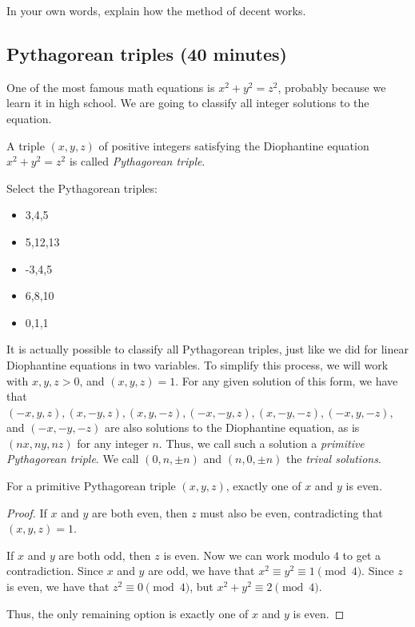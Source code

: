 \documentclass[letterpaper, 11 pt]{article}
\begin{document}
In your own words, explain how the method of decent works.
\subsection{Pythagorean triples (40 minutes)}
One of the most famous math equations is $x^2+y^2=z^2$, probably because we learn it in high school. We are going to classify all integer solutions to the equation.

\begin{defn}
 A triple $(x,y,z)$ of positive integers satisfying the Diophantine equation $x^2+y^2=z^2$ is called \emph{Pythagorean triple}.
\end{defn}

 Select the Pythagorean triples:
 \begin{poll}
\begin{itemize}
  \item  {3,4,5}
 \item {5,12,13}
 \item{-3,4,5}
 \item {6,8,10}
 \item{0,1,1}
\end{itemize}
\end{poll}

It is actually possible to classify all Pythagorean triples, just like we did for linear Diophantine equations in two variables. To simplify this process, we will work with $x,y,z>0$, and $(x,y,z)=1$. For any given solution of this form, we have that $(-x,y,z),(x,-y,z),(x,y,-z),(-x,-y,z),(x,-y,-z),(-x,y,-z),$ and $(-x,-y,-z)$ are also solutions to the Diophantine equation, as is $(nx,ny,nz)$ for any integer $n$. Thus, we call such a solution a \emph{primitive Pythagorean triple}.  We call $(0,n,\pm n)$ and $(n,0,\pm n)$ the \emph{trival solutions}.

\begin{thm}
For a primitive Pythagorean triple $(x,y,z)$, exactly one of $x$ and $y$ is even.
\end{thm}
\begin{proof}
 If $x$ and $y$ are both even, then $z$ must also be even, contradicting that $(x,y,z)=1$.
 
 If $x$ and $y$ are both odd, then $z$ is even. Now we can work modulo $4$ to get a contradiction. Since $x$ and $y$ are odd, we have that $x^2\equiv y^2\equiv 1\pmod 4$. Since $z$ is even, we have that $z^2\equiv 0\pmod 4$, but $x^2+y^2\equiv 2\pmod 4$.
 
 Thus, the only remaining option is exactly one of $x$ and $y$ is even.
\end{proof}
\end{document}
